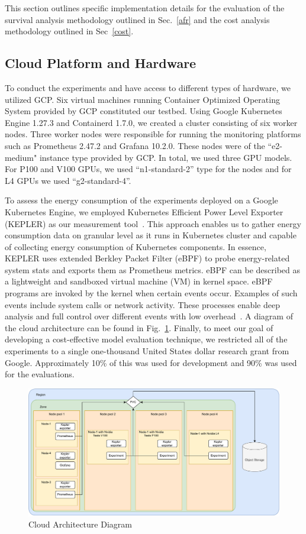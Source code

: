 \documentclass[conference]{IEEEtran}
\begin{document}
This section outlines specific implementation details for the evaluation of the survival analysis methodology outlined in Sec.~\ref{afr} and the cost analysis methodology outlined in Sec~\ref{cost}.


\subsection{Cloud Platform and Hardware}
To conduct the experiments and have access to different types of hardware, we utilized GCP. Six virtual machines running Container Optimized Operating System provided by GCP constituted our testbed. Using Google Kubernetes Engine 1.27.3 and Containerd 1.7.0,  we created a cluster consisting of six worker nodes. Three worker nodes were responsible for running the monitoring platforms such as Prometheus 2.47.2 and Grafana 10.2.0. These nodes were of the ``e2-medium" instance type provided by GCP. In total, we used three GPU models. For P100 and V100 GPUs, we used ``n1-standard-2'' type for the nodes and for L4 GPUs we used ``g2-standard-4''.

To assess the energy consumption of the experiments deployed on a Google Kubernetes Engine, we employed Kubernetes Efficient Power Level Exporter (KEPLER) as our measurement tool~\cite{amaral2023kepler}. This approach enables us to gather energy consumption data on granular level as it runs in Kubernetes cluster and capable of collecting energy consumption of Kubernetes components. In essence, KEPLER uses extended Berkley Packet Filter (eBPF) to probe energy-related system stats and exports them as Prometheus metrics. eBPF can be described as a lightweight and sandboxed virtual machine (VM) in kernel space. eBPF programs are invoked by the kernel when certain events occur. Examples of such events include system calls or network activity. These processes enable deep analysis and full control over different events with low overhead~\cite{sedghpour@ebpf}. A diagram of the cloud architecture can be found in Fig.~\ref{fig:architecture}. Finally, to meet our goal of developing a cost-effective model evaluation technique, we restricted all of the experiments to a single one-thousand United States dollar research grant from Google. Approximately 10\% of this was used for development and 90\% was used for the evaluations.

\begin{figure}
    \centering
    \includegraphics[width=.8\textwidth]{plots/architecture.pdf}
    \caption{Cloud Architecture Diagram}
    \label{fig:architecture}
\end{figure}
\end{document}
